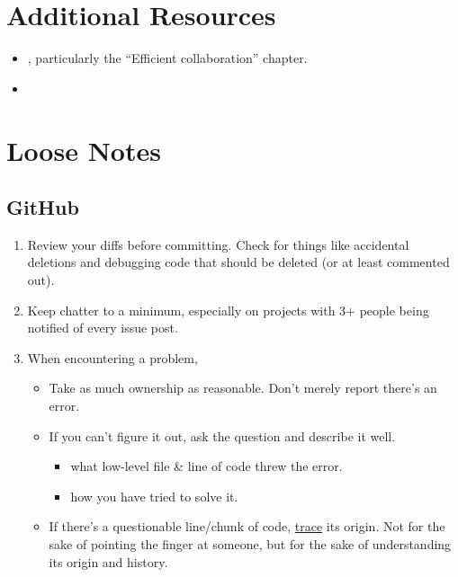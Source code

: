 \documentclass[
]{book}
\providecommand{\tightlist}{%
  \setlength{\itemsep}{0pt}\setlength{\parskip}{0pt}}
\begin{document}
\hypertarget{additional-resources-1}{%
\section{Additional Resources}\label{additional-resources-1}}

\begin{itemize}
\tightlist
\item
  \citep{gillespie}, particularly the ``Efficient collaboration'' chapter.
\item
  \citep{fitzpatrick}
\end{itemize}

\hypertarget{loose-notes}{%
\section{Loose Notes}\label{loose-notes}}

\hypertarget{github}{%
\subsection{GitHub}\label{github}}

\begin{enumerate}
\def\labelenumi{\arabic{enumi}.}
\item
  Review your diffs before committing. Check for things like accidental deletions and debugging code that should be deleted (or at least commented out).
\item
  Keep chatter to a minimum, especially on projects with 3+ people being notified of every issue post.
\item
  When encountering a problem,

  \begin{itemize}
  \tightlist
  \item
    Take as much ownership as reasonable. Don't merely report there's an error.
  \item
    If you can't figure it out, ask the question and describe it well.

    \begin{itemize}
    \tightlist
    \item
      what low-level file \& line of code threw the error.
    \item
      how you have tried to solve it.
    \end{itemize}
  \item
    If there's a questionable line/chunk of code, \href{https://help.github.com/articles/tracing-changes-in-a-file/}{trace} its origin. Not for the sake of pointing the finger at someone, but for the sake of understanding its origin and history.
  \end{itemize}
\end{enumerate}
\end{document}
